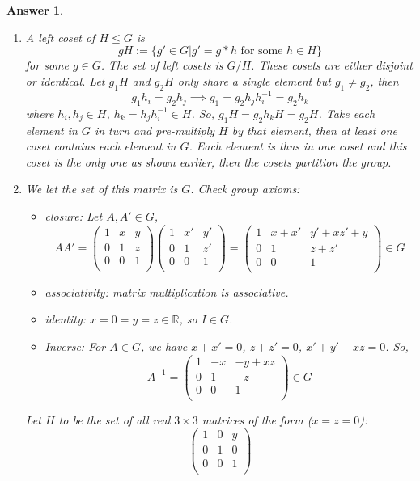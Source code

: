 \documentclass[a4paper]{article}
\newtheorem{ans}{Answer}[section]
\theoremstyle{new}
\begin{document}
\begin{ans}\leavevmode
\begin{enumerate}[label=(\alph*)]
\item A left coset of $H\leq G$ is 
$$gH:=\{g'\in G|g'=g*h\text{ for some }h\in H\}$$
for some $g\in G$. The set of left cosets is $G/H$. These cosets are either disjoint or identical. Let $g_1H$ and $g_2H$ only share a single element but $g_1\neq g_2$, then $$g_1h_i=g_2h_j\implies g_1=g_2h_jh_i^{-1}=g_2h_k$$
where $h_i,h_j\in H$, $h_k=h_jh_i^{-1}\in H$. So, $g_1H=g_2h_kH=g_2H$. Take each element in $G$ in turn and pre-multiply $H$ by that element, then at least one coset contains each element in $G$. Each element is thus in one coset and this coset is the only one as shown earlier, then the cosets partition the group.
\item We let the set of this matrix is $G$. Check group axioms:
\begin{itemize}
    \item closure: Let $A,A'\in G$,
    $$AA'= \begin{pmatrix}1&x&y\\0&1&z\\0&0&1\\\end{pmatrix} \begin{pmatrix}1&x'&y'\\0&1&z'\\0&0&1\\\end{pmatrix}= \begin{pmatrix}1&x+x'&y'+xz'+y\\0&1&z+z'\\0&0&1\\\end{pmatrix}\in G$$
    \item associativity: matrix multiplication is associative.
    \item identity: $x=0=y=z\in\mathbb{R}$, so $I\in G$.
    \item Inverse: For $A\in G$, we have $x+x'=0$, $z+z'=0$, $x'+y'+xz=0$. So, $$A^{-1}= \begin{pmatrix}1&-x&-y+xz\\0&1&-z\\0&0&1\\\end{pmatrix}\in G$$
\end{itemize}
Let $H$ to be the set of all real $3\times 3$ matrices of the form ($x=z=0$):
$$\begin{pmatrix}1&0&y\\0&1&0\\0&0&1\\\end{pmatrix}$$

\end{enumerate}
\end{ans}
\end{document}
